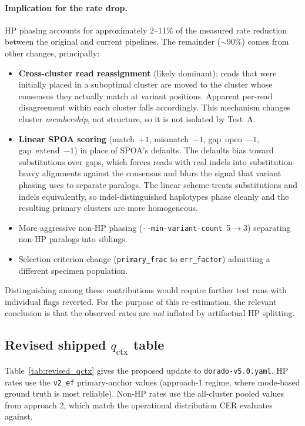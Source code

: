 \documentclass[11pt]{article}
\begin{document}
\paragraph{Implication for the rate drop.} HP phasing accounts for
approximately 2--11\% of the measured rate reduction between the original
and current pipelines. The remainder (${\sim}90\%$) comes from other
changes, principally:

\begin{itemize}
\item \textbf{Cross-cluster read reassignment} (likely dominant): reads that
were initially placed in a suboptimal cluster are moved to the cluster whose
consensus they actually match at variant positions. Apparent per-read
disagreement within each cluster falls accordingly. This mechanism changes
cluster \emph{membership}, not structure, so it is not isolated by Test~A.
\item \textbf{Linear SPOA scoring} (match~$+1$, mismatch~$-1$,
gap~open~$-1$, gap~extend~$-1$) in place of SPOA's defaults. The
defaults bias toward substitutions over gaps, which forces reads with
real indels into substitution-heavy alignments against the consensus
and blurs the signal that variant phasing uses to separate paralogs.
The linear scheme treats substitutions and indels equivalently, so
indel-distinguished haplotypes phase cleanly and the resulting
primary clusters are more homogeneous.
\item More aggressive non-HP phasing (\texttt{-{}-min-variant-count}\ 5$\to$3)
separating non-HP paralogs into siblings.
\item Selection criterion change (\texttt{primary\_frac} to
\texttt{err\_factor}) admitting a different specimen population.
\end{itemize}

Distinguishing among these contributions would require further test runs
with individual flags reverted. For the purpose of this re-estimation, the
relevant conclusion is that the observed rates are \emph{not} inflated by
artifactual HP splitting.

\subsection{Revised shipped $q_\text{ctx}$ table}
\label{sec:revised_qctx}

Table~\ref{tab:revised_qctx} gives the proposed update to
\texttt{dorado-v5.0.yaml}. HP rates use the \texttt{v2\_ef} primary-anchor
values (approach-1 regime, where mode-based ground truth is most reliable).
Non-HP rates use the all-cluster pooled values from approach 2, which match
the operational distribution CER evaluates against.
\end{document}
